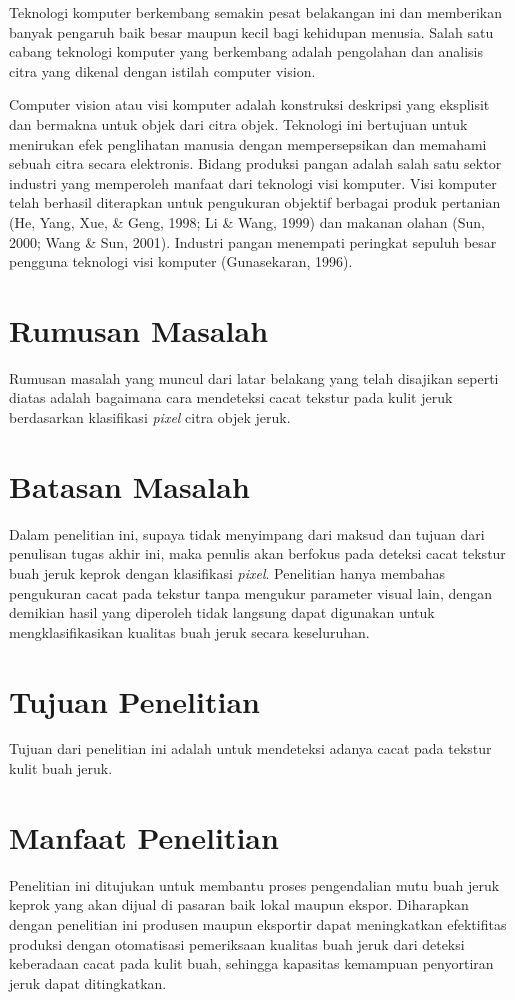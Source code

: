 \documentclass[laporan.tex]{subfiles}
\begin{document}
Teknologi komputer berkembang semakin pesat belakangan ini dan memberikan banyak pengaruh baik besar maupun kecil bagi kehidupan menusia. Salah satu cabang teknologi komputer yang berkembang adalah pengolahan dan analisis citra yang dikenal dengan istilah computer vision.

Computer vision atau visi komputer adalah konstruksi deskripsi yang eksplisit dan bermakna untuk objek dari citra objek. Teknologi ini bertujuan untuk menirukan efek penglihatan manusia dengan mempersepsikan dan memahami sebuah citra secara elektronis.
Bidang produksi pangan adalah salah satu sektor industri yang memperoleh manfaat dari teknologi visi komputer. Visi komputer telah berhasil diterapkan untuk pengukuran objektif berbagai produk pertanian (He, Yang, Xue, \& Geng, 1998; Li \& Wang, 1999) dan makanan olahan (Sun, 2000; Wang \& Sun, 2001). Industri pangan menempati peringkat sepuluh besar pengguna teknologi visi komputer (Gunasekaran, 1996).


\section{Rumusan Masalah}

Rumusan masalah yang muncul dari latar belakang yang telah disajikan seperti diatas adalah bagaimana cara mendeteksi cacat tekstur pada kulit jeruk berdasarkan klasifikasi \emph{pixel} citra objek jeruk.

\section{Batasan Masalah}

Dalam penelitian ini, supaya tidak menyimpang dari maksud dan tujuan dari penulisan tugas akhir ini, maka penulis akan berfokus pada deteksi cacat tekstur buah jeruk keprok dengan klasifikasi \emph{pixel}. Penelitian hanya membahas pengukuran cacat pada tekstur tanpa mengukur parameter visual lain, dengan demikian hasil yang diperoleh tidak langsung dapat digunakan untuk mengklasifikasikan kualitas buah jeruk secara keseluruhan.

\section{Tujuan Penelitian}

Tujuan dari penelitian ini adalah untuk mendeteksi adanya cacat pada tekstur kulit buah jeruk.

\section{Manfaat Penelitian}

Penelitian ini ditujukan untuk membantu proses pengendalian mutu buah jeruk keprok yang akan dijual di pasaran baik lokal maupun ekspor. Diharapkan dengan penelitian ini produsen maupun eksportir dapat meningkatkan efektifitas produksi dengan otomatisasi pemeriksaan kualitas buah jeruk dari deteksi keberadaan cacat pada kulit buah, sehingga kapasitas kemampuan penyortiran jeruk dapat ditingkatkan.
\end{document}

